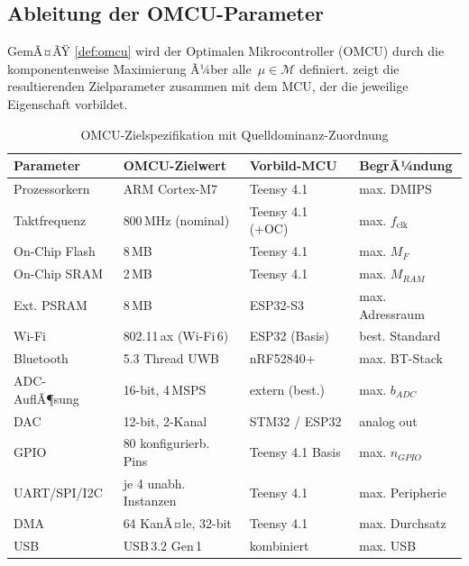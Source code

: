 ﻿\documentclass[12pt, a4paper]{article}
\theoremstyle{plain}
\theoremstyle{definition}
\theoremstyle{remark}
\newcommand{\omcu}{\textsc{OMCU}}
\begin{document}
\subsection{Ableitung der OMCU-Parameter}

GemÃ¤ÃŸ \cref{def:omcu} wird der Optimalen Mikrocontroller (\omcu{}) durch die komponentenweise
Maximierung Ã¼ber alle~$\mu \in \mathcal{M}$ definiert.
 zeigt die resultierenden Zielparameter
zusammen mit dem MCU, der die jeweilige Eigenschaft vorbildet.

\begin{table}[H]
  \centering
  \caption{OMCU-Zielspezifikation mit Quelldominanz-Zuordnung}
  \label{tab:omcu_params}
  \begin{tabular}{llll}
    \toprule
    \textbf{Parameter} & \textbf{OMCU-Zielwert} & \textbf{Vorbild-MCU} & \textbf{BegrÃ¼ndung}\\
    \midrule
    Prozessorkern          & ARM Cortex-M7 & Teensy 4.1       & max. DMIPS \\
    Taktfrequenz           & 800\,MHz (nominal)       & Teensy 4.1 (+OC) & max. $f_\text{clk}$\\
    On-Chip Flash          & 8\,MB                    & Teensy 4.1       & max. $M_F$ \\
    On-Chip SRAM           & 2\,MB                    & Teensy 4.1       & max. $M_{RAM}$ \\
    Ext. PSRAM             & 8\,MB                    & ESP32-S3         & max. Adressraum\\
    Wi-Fi                  & 802.11\,ax (Wi-Fi\,6)    & ESP32 (Basis)    & best. Standard \\
    Bluetooth              & 5.3 Thread UWB       & nRF52840+        & max. BT-Stack \\
    ADC-AuflÃ¶sung          & 16-bit, 4\,MSPS          & extern (best.)   & max. $b_{ADC}$\\
    DAC                    & 12-bit, 2-Kanal           & STM32 / ESP32    & analog out \\
    GPIO                   & 80 konfigurierb. Pins    & Teensy 4.1 Basis & max. $n_{GPIO}$\\
    UART/SPI/I2C           & je 4 unabh. Instanzen    & Teensy 4.1       & max. Peripherie \\
    DMA                    & 64 KanÃ¤le, 32-bit         & Teensy 4.1       & max. Durchsatz \\
    USB                    & USB\,3.2 Gen\,1   & kombiniert       & max. USB\\

\end{tabular}
\end{table}
\end{document}

